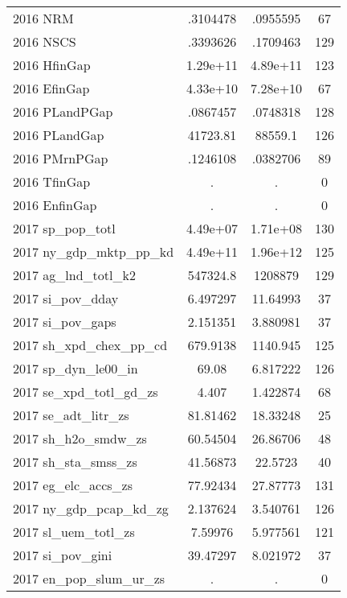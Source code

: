 {\begin{tabular}{l*{1}{ccc}}
2016 NRM            &    .3104478&    .0955595&          67\\
2016 NSCS           &    .3393626&    .1709463&         129\\
2016 HfinGap        &    1.29e+11&    4.89e+11&         123\\
2016 EfinGap        &    4.33e+10&    7.28e+10&          67\\
2016 PLandPGap      &    .0867457&    .0748318&         128\\
2016 PLandGap       &    41723.81&     88559.1&         126\\
2016 PMrnPGap       &    .1246108&    .0382706&          89\\
2016 TfinGap        &           .&           .&           0\\
2016 EnfinGap       &           .&           .&           0\\
2017 sp\_pop\_totl    &    4.49e+07&    1.71e+08&         130\\
2017 ny\_gdp\_mktp\_pp\_kd&    4.49e+11&    1.96e+12&         125\\
2017 ag\_lnd\_totl\_k2 &    547324.8&     1208879&         129\\
2017 si\_pov\_dday    &    6.497297&    11.64993&          37\\
2017 si\_pov\_gaps    &    2.151351&    3.880981&          37\\
2017 sh\_xpd\_chex\_pp\_cd&    679.9138&    1140.945&         125\\
2017 sp\_dyn\_le00\_in &       69.08&    6.817222&         126\\
2017 se\_xpd\_totl\_gd\_zs&       4.407&    1.422874&          68\\
2017 se\_adt\_litr\_zs &    81.81462&    18.33248&          25\\
2017 sh\_h2o\_smdw\_zs &    60.54504&    26.86706&          48\\
2017 sh\_sta\_smss\_zs &    41.56873&     22.5723&          40\\
2017 eg\_elc\_accs\_zs &    77.92434&    27.87773&         131\\
2017 ny\_gdp\_pcap\_kd\_zg&    2.137624&    3.540761&         126\\
2017 sl\_uem\_totl\_zs &     7.59976&    5.977561&         121\\
2017 si\_pov\_gini    &    39.47297&    8.021972&          37\\
2017 en\_pop\_slum\_ur\_zs&           .&           .&           0\\

\end{tabular}}
